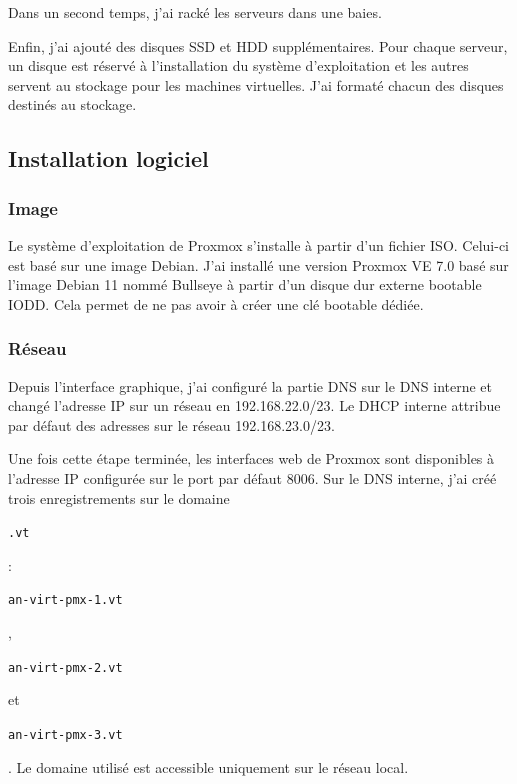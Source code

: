 \documentclass[12pt, a4paper, twoside]{article}
\begin{document}
Dans un second temps, j'ai racké les serveurs dans une baies. 

Enfin, j'ai ajouté des disques \gls{SSD} et \gls{HDD} supplémentaires.
Pour chaque serveur, un disque est réservé à l'installation du système d'exploitation et les autres servent au stockage pour les machines virtuelles.
J'ai formaté chacun des disques destinés au stockage.

\subsection{Installation logiciel}
\subsubsection{Image}
Le système d'exploitation de \gls{Proxmox} s'installe à partir d'un fichier \gls{ISO}. 
Celui-ci est basé sur une image \gls{Debian}. 
J'ai installé une version \gls{Proxmox} VE 7.0 basé sur l'image \gls{Debian} 11 nommé Bullseye à partir d'un disque dur externe bootable IODD. 
Cela permet de ne pas avoir à créer une clé bootable dédiée.

\subsubsection{Réseau}
Depuis l'interface graphique, j'ai configuré la partie \gls{DNS} sur le \gls{DNS} interne et changé l'adresse \gls{IP} sur un réseau en 192.168.22.0/23. 
Le DHCP interne attribue par défaut des adresses sur le réseau 192.168.23.0/23.

Une fois cette étape terminée, les interfaces web de \gls{Proxmox} sont disponibles à l'adresse \gls{IP} configurée sur le port par défaut 8006.
Sur le \gls{DNS} interne, j'ai créé trois enregistrements sur le domaine \begin{code}\texttt{.vt}\end{code}: \begin{code}\texttt{an-virt-pmx-1.vt}\end{code}, \begin{code}\texttt{an-virt-pmx-2.vt}\end{code} et \begin{code}\texttt{an-virt-pmx-3.vt}\end{code}.
Le domaine utilisé est accessible uniquement sur le réseau local.
\end{document}
